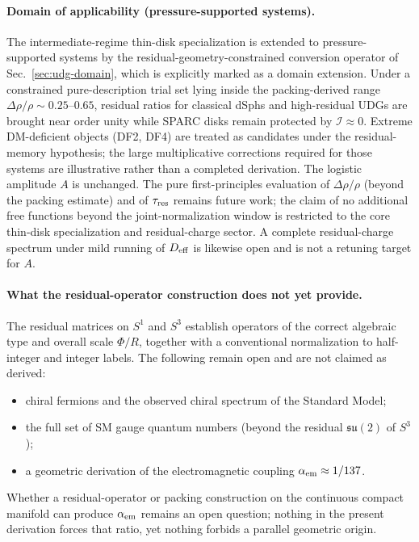 \documentclass[11pt,a4paper]{article}
\begin{document}
\paragraph{Domain of applicability (pressure-supported systems).}
The intermediate-regime thin-disk specialization is extended to pressure-supported systems by the residual-geometry-constrained conversion operator of Sec.~\ref{sec:udg-domain}, which is explicitly marked as a domain extension. Under a constrained pure-description trial set lying inside the packing-derived range \(\Delta\rho/\rho\sim0.25\)--\(0.65\), residual ratios for classical dSphs and high-residual UDGs are brought near order unity while SPARC disks remain protected by \(\mathcal{I}\approx0\). Extreme DM-deficient objects (DF2, DF4) are treated as candidates under the residual-memory hypothesis; the large multiplicative corrections required for those systems are illustrative rather than a completed derivation. The logistic amplitude \(A\) is unchanged. The pure first-principles evaluation of \(\Delta\rho/\rho\) (beyond the packing estimate) and of \(\tau_{\rm res}\) remains future work; the claim of no additional free functions beyond the joint-normalization window is restricted to the core thin-disk specialization and residual-charge sector. A complete residual-charge spectrum under mild running of \(D_{\rm eff}\) is likewise open and is not a retuning target for \(A\).

\paragraph{What the residual-operator construction does not yet provide.}
The residual matrices on \(S^1\) and \(S^3\) establish operators of the correct algebraic type and overall scale \(\Phi/R\), together with a conventional normalization to half-integer and integer labels. The following remain open and are not claimed as derived:
\begin{itemize}[leftmargin=*]
\item chiral fermions and the observed chiral spectrum of the Standard Model;
\item the full set of SM gauge quantum numbers (beyond the residual \(\mathfrak{su}(2)\) of \(S^3\));
\item a geometric derivation of the electromagnetic coupling \(\alpha_{\rm em}\approx 1/137\).
\end{itemize}
Whether a residual-operator or packing construction on the continuous compact manifold can produce \(\alpha_{\rm em}\) remains an open question; nothing in the present derivation forces that ratio, yet nothing forbids a parallel geometric origin.
\end{document}

